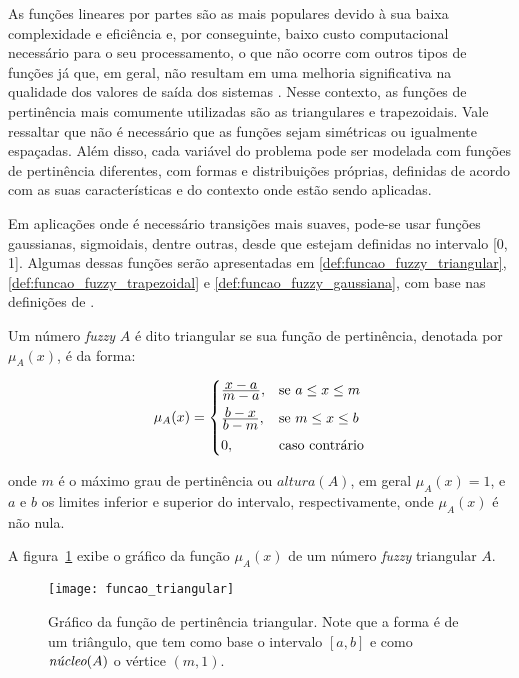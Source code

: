 As funções lineares por partes são as mais populares devido à sua baixa complexidade e eficiência e, por conseguinte, baixo custo computacional necessário para o seu processamento, o que não ocorre com outros tipos de funções já que, em geral, não resultam em uma melhoria significativa na qualidade dos valores de saída dos sistemas \citep{yen:99}. Nesse contexto, as funções de pertinência mais comumente utilizadas são as triangulares e trapezoidais. Vale ressaltar que não é necessário que as funções sejam simétricas ou igualmente  espaçadas. Além disso, cada variável do problema pode ser modelada com funções de pertinência diferentes,  com  formas  e  distribuições  próprias, definidas  de  acordo com  as suas características e do contexto onde estão sendo aplicadas.

Em aplicações onde é necessário transições mais suaves, pode-se usar funções gaussianas, sigmoidais, dentre outras, desde que estejam definidas no intervalo [0, 1]. Algumas dessas funções serão apresentadas em \ref{def:funcao_fuzzy_triangular}, \ref{def:funcao_fuzzy_trapezoidal} e \ref{def:funcao_fuzzy_gaussiana}, com base nas definições de \citet{sumathi:10}.

\begin{defn}
\label{def:funcao_fuzzy_triangular}
Um número \emph{fuzzy} $A$ é dito triangular se sua função de pertinência, denotada por $\mu_{A}(x)$, é da forma:

\begin{equation}
  \mu_A(x) =  \begin{cases}
                \frac{\displaystyle x - a}{\displaystyle m - a}, & \text{se}\ a \leq x \leq m\\[0.5em]
                \frac{\displaystyle b - x}{\displaystyle b - m}, & \text{se}\ m \leq x \leq b\\[0.5em]
                0, & \text{caso contrário}
              \end{cases}
\end{equation}
\end{defn}
\noindent onde $m$ é o máximo grau de pertinência ou $altura(A)$, em geral $\mu_A(x) = 1$, e $a$ e $b$ os limites inferior e superior do intervalo, respectivamente, onde $\mu_A(x)$ é não nula.

A figura~\ref{fig:funcao_fuzzy_triangular} exibe o gráfico da função $\mu_A(x)$ de um número \emph{fuzzy} triangular $A$.

\begin{figure}[!h]
  \centering
  \texttt{[image: funcao\_triangular]}
  \caption[Gráfico da função de pertinência triangular]{Gráfico da função de pertinência triangular. Note que a forma é de um triângulo, que tem como base o intervalo $[a, b]$ e como $\emph{núcleo}(A)$ o vértice $(m, 1)$.}
  \label{fig:funcao_fuzzy_triangular}
\end{figure}

